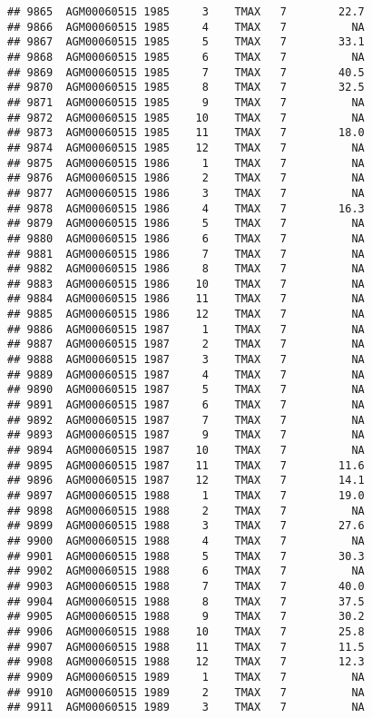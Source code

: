 \documentclass{article}\usepackage[]{graphicx}\usepackage[]{color}
\makeatletter
\newenvironment{kframe}{%
 \def\at@end@of@kframe{}%
 \ifinner\ifhmode%
  \def\at@end@of@kframe{\end{minipage}}%
  \begin{minipage}{\columnwidth}%
 \fi\fi%
 \def\FrameCommand##1{\hskip\@totalleftmargin \hskip-\fboxsep
 \colorbox{shadecolor}{##1}\hskip-\fboxsep
     \hskip-\linewidth \hskip-\@totalleftmargin \hskip\columnwidth}%
 \MakeFramed {\advance\hsize-\width
   \@totalleftmargin\z@ \linewidth\hsize
   \@setminipage}}%
 {\par\unskip\endMakeFramed%
 \at@end@of@kframe}
\newenvironment{knitrout}{}{} %
\makeatother
\begin{document}
\begin{knitrout}
\begin{kframe}
\begin{verbatim}
## 9865  AGM00060515 1985     3    TMAX   7        22.7
## 9866  AGM00060515 1985     4    TMAX   7          NA
## 9867  AGM00060515 1985     5    TMAX   7        33.1
## 9868  AGM00060515 1985     6    TMAX   7          NA
## 9869  AGM00060515 1985     7    TMAX   7        40.5
## 9870  AGM00060515 1985     8    TMAX   7        32.5
## 9871  AGM00060515 1985     9    TMAX   7          NA
## 9872  AGM00060515 1985    10    TMAX   7          NA
## 9873  AGM00060515 1985    11    TMAX   7        18.0
## 9874  AGM00060515 1985    12    TMAX   7          NA
## 9875  AGM00060515 1986     1    TMAX   7          NA
## 9876  AGM00060515 1986     2    TMAX   7          NA
## 9877  AGM00060515 1986     3    TMAX   7          NA
## 9878  AGM00060515 1986     4    TMAX   7        16.3
## 9879  AGM00060515 1986     5    TMAX   7          NA
## 9880  AGM00060515 1986     6    TMAX   7          NA
## 9881  AGM00060515 1986     7    TMAX   7          NA
## 9882  AGM00060515 1986     8    TMAX   7          NA
## 9883  AGM00060515 1986    10    TMAX   7          NA
## 9884  AGM00060515 1986    11    TMAX   7          NA
## 9885  AGM00060515 1986    12    TMAX   7          NA
## 9886  AGM00060515 1987     1    TMAX   7          NA
## 9887  AGM00060515 1987     2    TMAX   7          NA
## 9888  AGM00060515 1987     3    TMAX   7          NA
## 9889  AGM00060515 1987     4    TMAX   7          NA
## 9890  AGM00060515 1987     5    TMAX   7          NA
## 9891  AGM00060515 1987     6    TMAX   7          NA
## 9892  AGM00060515 1987     7    TMAX   7          NA
## 9893  AGM00060515 1987     9    TMAX   7          NA
## 9894  AGM00060515 1987    10    TMAX   7          NA
## 9895  AGM00060515 1987    11    TMAX   7        11.6
## 9896  AGM00060515 1987    12    TMAX   7        14.1
## 9897  AGM00060515 1988     1    TMAX   7        19.0
## 9898  AGM00060515 1988     2    TMAX   7          NA
## 9899  AGM00060515 1988     3    TMAX   7        27.6
## 9900  AGM00060515 1988     4    TMAX   7          NA
## 9901  AGM00060515 1988     5    TMAX   7        30.3
## 9902  AGM00060515 1988     6    TMAX   7          NA
## 9903  AGM00060515 1988     7    TMAX   7        40.0
## 9904  AGM00060515 1988     8    TMAX   7        37.5
## 9905  AGM00060515 1988     9    TMAX   7        30.2
## 9906  AGM00060515 1988    10    TMAX   7        25.8
## 9907  AGM00060515 1988    11    TMAX   7        11.5
## 9908  AGM00060515 1988    12    TMAX   7        12.3
## 9909  AGM00060515 1989     1    TMAX   7          NA
## 9910  AGM00060515 1989     2    TMAX   7          NA
## 9911  AGM00060515 1989     3    TMAX   7          NA

\end{verbatim}
\end{kframe}
\end{knitrout}
\end{document}
